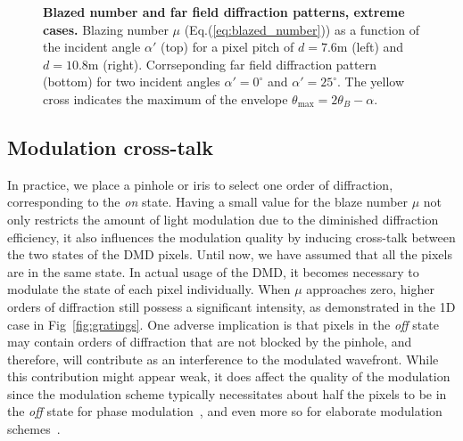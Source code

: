 \documentclass[12pt]{iopart}
\begin{document}
\begin{figure}
\begin{subfigure}{0.49\textwidth}
  \end{subfigure}
  \caption{
    \textbf{Blazed number and far field diffraction patterns, extreme cases.}
    Blazing number $\mu$ (Eq.(\ref{eq:blazed_number})) as a function of the incident angle $\alpha'$  (top)
    for a pixel pitch of $d=7.6$\textmu m (left)
    and $d=10.8$\textmu m (right).
    Corrseponding far field diffraction pattern (bottom)
    for two incident angles $\alpha' = 0^\circ$ and $\alpha' = 25^\circ$.
    The yellow cross indicates the maximum of the envelope $\theta_\text{max} = 2\theta_B - \alpha$.
  }
  \label{fig:mu76}
\end{figure}

\subsection{Modulation cross-talk}

In practice, we place a pinhole or iris to select
one order of diffraction,
corresponding to the {\em on} state.
Having a small value for the blaze number $\mu$
not only restricts the amount of light modulation
due to the diminished diffraction efficiency,
it also influences the modulation quality by inducing cross-talk
between the two states of the DMD pixels.
Until now, we have assumed that all the pixels are in the same state.
In actual usage of the DMD,
it becomes necessary to modulate the state of each pixel individually.
When $\mu$ approaches zero, higher orders of diffraction
still possess a significant intensity,
as demonstrated in the 1D case in Fig~\ref{fig:gratings}.
One adverse implication is that pixels in the {\em off} state
may contain orders of diffraction that are not blocked by the pinhole,
and therefore, will contribute as an interference to the modulated wavefront.
While this contribution might appear weak,
it does affect the quality of the modulation
since the modulation scheme typically necessitates about half the pixels
to be in the {\em off} state for phase modulation~\cite{lee1979binary},
and even more so for elaborate modulation schemes~\cite{goorden2014superpixel,Gutierrez2024DMD}.\\
\end{document}
